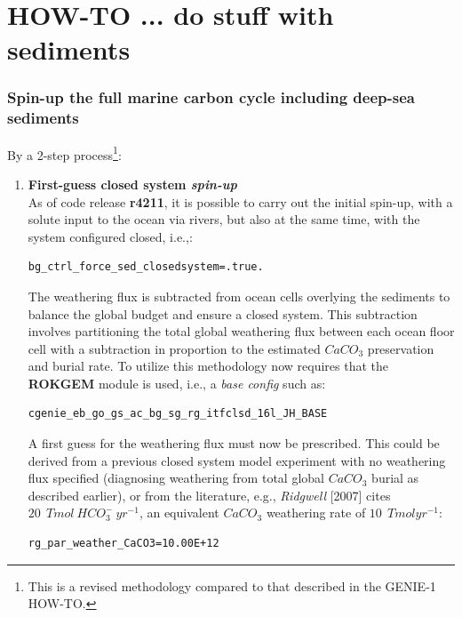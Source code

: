\documentclass[11pt,fleqn]{book} %
\begin{document}
\section{HOW-TO ... do  stuff with sediments}

%
\subsubsection{Spin-up the full marine carbon cycle including deep-sea sediments}\label{Spin-up the full marine carbon cycle including sediments}

\vspace{1mm}
By a 2-step process\footnote{This is a revised methodology compared to that described in the GENIE-1 HOW-TO.}:

\begin{enumerate}

\vspace{1mm}
\item \textbf{First-guess closed system \textit{spin-up}}
\\As of code release \textbf{r4211}, it is possible to carry out the initial spin-up, with a solute input to the ocean via rivers, but also at the same time, with the system configured closed, i.e.,:
\vspace{-1mm}\begin{verbatim}bg_ctrl_force_sed_closedsystem=.true.\end{verbatim}\vspace{-1mm}
The weathering flux is subtracted from ocean cells overlying the sediments to balance the global budget and ensure a closed system. This subtraction involves partitioning the total global weathering flux between each ocean floor cell with a subtraction in proportion to the estimated \(CaCO_{3}\) preservation and burial rate. To utilize this methodology now requires that the \textbf{ROKGEM} module is used, i.e., a \textit{base config} such as:
\vspace{-1mm}\begin{verbatim}cgenie_eb_go_gs_ac_bg_sg_rg_itfclsd_16l_JH_BASE\end{verbatim}\vspace{-1mm}
A first guess for the weathering flux must now be prescribed. This could be derived from a previous closed system model experiment with no weathering flux specified (diagnosing weathering from total global \(CaCO_{3}\) burial as described earlier), or from the literature, e.g., \textit{Ridgwell} [2007] cites \(20\:\ Tmol \:HCO^{-}_{3} \:yr^{-1}\), an equivalent \(CaCO_{3}\) weathering rate of \(10\:\ Tmol yr^{-1}\):
\vspace{-1mm}\begin{verbatim}rg_par_weather_CaCO3=10.00E+12\end{verbatim}\vspace{-1mm}


\end{enumerate}
\end{document}
